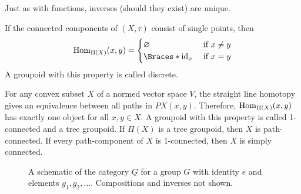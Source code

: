 \documentclass[a5paper]{article}
\begin{document}

Just as with functions, inverses (should they exist) are unique.


\begin{example*}
	If the connected components of $(X,\tau)$ consist of single points, then
  \begin{equation*}
    \Hom_{\Pi(X)}(x,y) = \begin{cases}
      \emptyset &\text{ if }x\neq y \\
      \braces{\id_x} &\text{ if }x=y
    \end{cases}
  \end{equation*}
  A groupoid with this property is called discrete.

  For any convex subset $X$ of a normed vector space $V$, the straight line
  homotopy gives an equivalence between all paths in $PX(x,y)$. Therefore,
  $\operatorname{Hom}_{\Pi(X)}(x,y)$ has exactly one object for all $x,y\in X$. A groupoid
  with this property is called 1-connected and a tree groupoid. If $\Pi(X)$ is a
  tree groupoid, then $X$ is path-connected. If every path-component of $X$ is
  1-connected, then $X$ is simply connected.
\end{example*}

\begin{figure}[ht]
  \centering
  \caption{
    \label{fig:grp} A schematic of the category $\underline{G}$ for a
    group $G$ with identity $e$ and elements $g_1,g_2,\ldots$. Compositions and
    inverses not shown.
  }
\end{figure}
\end{document}
